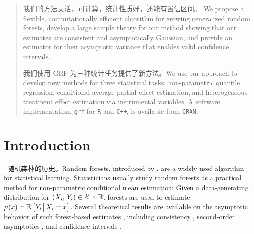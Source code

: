 \documentclass[aos]{imsart}
\theoremstyle{plain}
\theoremstyle{definition}
\theoremstyle{remark}
\begin{document}
\begin{CJK}{UTF8}{gbsn}
\begin{frontmatter}
\begin{abstract}
{我们的方法灵活，可计算，统计性质好，还能有置信区间。 We propose a flexible, computationally efficient algorithm for growing generalized random forests, develop a large sample theory for our method showing that our estimates are consistent and asymptotically Gaussian, and provide an estimator for their asymptotic variance that enables valid confidence intervals.

我们使用 GRF 为三种统计任务提供了新方法。We use our approach to develop new methods for three statistical tasks:
non-parametric quantile regression,
conditional average partial effect estimation,
and heterogeneous treatment effect estimation via instrumental variables.
A software implementation, \texttt{grf} for \texttt{R} and \texttt{C++}, is
available from \texttt{CRAN}.}
\end{abstract}

\end{frontmatter}

\newpage
\tableofcontents
\newpage
\section{Introduction}
\, 随机森林的历史。Random forests, introduced by \citet{breiman2001random}, are a widely used algorithm for statistical learning.
Statisticians usually study random forests as a practical method for non-parametric conditional mean estimation:
Given a data-generating distribution for $(X_i, \, Y_i) \in \mathcal{X} \times \mathbb{R}$, forests are used to estimate
$\mu(x) = \mathbb{E}_{}\left[Y_i \,\big|\, X_i = x\right]$.
Several theoretical results are available on the asymptotic behavior of such forest-based
estimates , including consistency
\citep{arlot2014analysis,biau2008consistency,biau2012analysis,denil2014narrowing,lin2006random,
scornet2015consistency,wager2015uniform},
second-order asymptotics \citep{mentch2016quantifying},
and confidence intervals \citep{wager2015estimation}.


\end{CJK}
\end{document}
